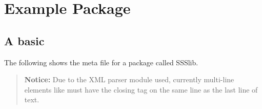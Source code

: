 
\section{Example Package}
\label{sect:example-pkg}

\subsection{A basic }
\label{sect:example-config-xml}

The following shows the meta file for a package called SSSlib.  

\begin{verse}
   {\bfseries Notice: } Due to the XML parser module used, currently
   multi-line elements like  must have the closing tag
   on the same line as the last line of text.  
\end{verse}


